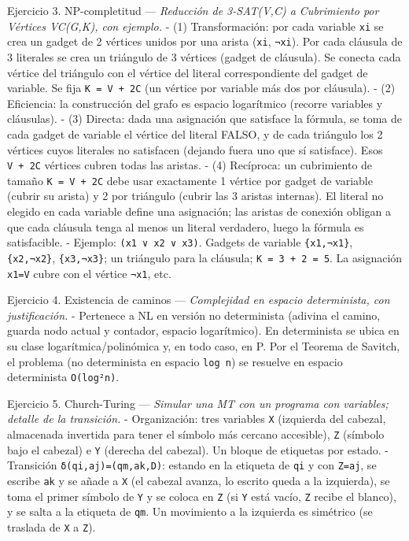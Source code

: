 \documentclass[12pt]{book} %
\begin{document}
Ejercicio 3. NP-completitud --- \emph{Reducción de 3-SAT(V,C) a
Cubrimiento por Vértices VC(G,K), con ejemplo.} - (1) Transformación:
por cada variable \texttt{xi} se crea un gadget de 2 vértices unidos por
una arista (\texttt{xi}, \texttt{¬xi}). Por cada cláusula de 3 literales
se crea un triángulo de 3 vértices (gadget de cláusula). Se conecta cada
vértice del triángulo con el vértice del literal correspondiente del
gadget de variable. Se fija
\texttt{K\ =\ \textbar{}V\textbar{}\ +\ 2\textbar{}C\textbar{}} (un
vértice por variable más dos por cláusula). - (2) Eficiencia: la
construcción del grafo es espacio logarítmico (recorre variables y
cláusulas). - (3) Directa: dada una asignación que satisface la fórmula,
se toma de cada gadget de variable el vértice del literal FALSO, y de
cada triángulo los 2 vértices cuyos literales no satisfacen (dejando
fuera uno que sí satisface). Esos
\texttt{\textbar{}V\textbar{}\ +\ 2\textbar{}C\textbar{}} vértices
cubren todas las aristas. - (4) Recíproca: un cubrimiento de tamaño
\texttt{K\ =\ \textbar{}V\textbar{}\ +\ 2\textbar{}C\textbar{}} debe
usar exactamente 1 vértice por gadget de variable (cubrir su arista) y 2
por triángulo (cubrir las 3 aristas internas). El literal no elegido en
cada variable define una asignación; las aristas de conexión obligan a
que cada cláusula tenga al menos un literal verdadero, luego la fórmula
es satisfacible. - Ejemplo: \texttt{(x1\ ∨\ x2\ ∨\ x3)}. Gadgets de
variable \texttt{\{x1,¬x1\}}, \texttt{\{x2,¬x2\}}, \texttt{\{x3,¬x3\}};
un triángulo para la cláusula; \texttt{K\ =\ 3\ +\ 2\ =\ 5}. La
asignación \texttt{x1=V} cubre con el vértice \texttt{¬x1}, etc.

Ejercicio 4. Existencia de caminos --- \emph{Complejidad en espacio
determinista, con justificación.} - Pertenece a NL en versión no
determinista (adivina el camino, guarda nodo actual y contador, espacio
logarítmico). En determinista se ubica en su clase
logarítmica/polinómica y, en todo caso, en P. Por el Teorema de Savitch,
el problema (no determinista en espacio \texttt{log\ n}) se resuelve en
espacio determinista \texttt{O(log²n)}.

Ejercicio 5. Church-Turing --- \emph{Simular una MT con un programa con
variables; detalle de la transición.} - Organización: tres variables
\texttt{X} (izquierda del cabezal, almacenada invertida para tener el
símbolo más cercano accesible), \texttt{Z} (símbolo bajo el cabezal) e
\texttt{Y} (derecha del cabezal). Un bloque de etiquetas por estado. -
Transición \texttt{δ(qi,aj)=(qm,ak,D)}: estando en la etiqueta de
\texttt{qi} y con \texttt{Z=aj}, se escribe \texttt{ak} y se añade a
\texttt{X} (el cabezal avanza, lo escrito queda a la izquierda), se toma
el primer símbolo de \texttt{Y} y se coloca en \texttt{Z} (si \texttt{Y}
está vacío, \texttt{Z} recibe el blanco), y se salta a la etiqueta de
\texttt{qm}. Un movimiento a la izquierda es simétrico (se traslada de
\texttt{X} a \texttt{Z}).
\end{document}
